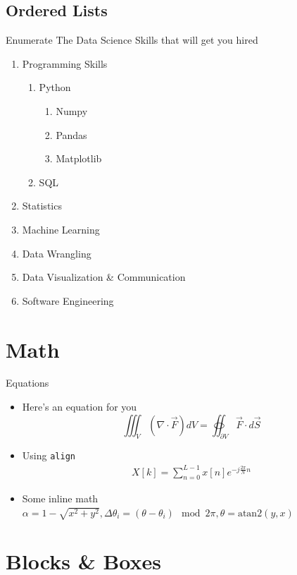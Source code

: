\documentclass[aspectratio=169,envcountsect]{beamer}    %
\begin{document}
\subsection{Ordered Lists}
\begin{frame}{Enumerate}
	The Data Science Skills that will get you hired
    \begin{enumerate}
        \item Programming Skills
        \begin{enumerate}
        	\item Python
        	\begin{enumerate}
        		\item Numpy
        		\item Pandas
        		\item Matplotlib
        	\end{enumerate}
        	\item SQL
        \end{enumerate}
        \item Statistics
        \item Machine Learning
        \item Data Wrangling
        \item Data Visualization \& Communication
        \item Software Engineering
    \end{enumerate}
\end{frame}

\section{Math}
\begin{frame}{Equations}
	\begin{itemize}
		\item Here's an equation for you
			\[
				\iiint_V \left( \nabla \cdot \vec{F} \right) dV = \oiint_{\partial V} \vec{F}\cdot d\vec{S}
			\]
		\item Using \texttt{align}
		\begin{align}
			X[k] = \sum_{n=0}^{L-1}x[n]e^{-j\frac{2\pi}{N}n} 
		\end{align}
		\item Some inline math $\alpha=1-\sqrt{x^2+y^2}, \Delta\theta_i=(\theta-\theta_i)\mod 2\pi, \theta=\text{atan2}(y,x)$ 
	\end{itemize}
\end{frame}

\section{Blocks \& Boxes}
\end{document}
